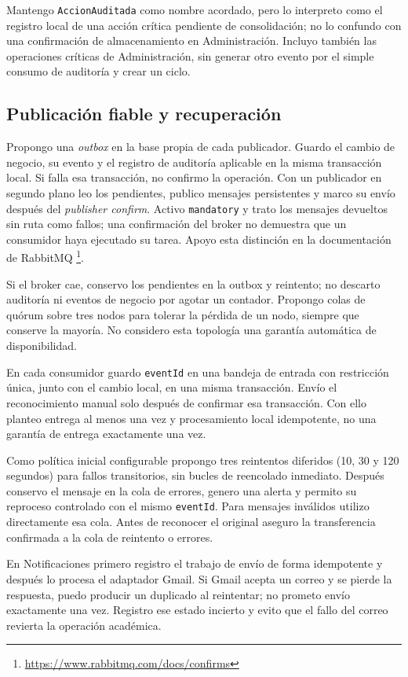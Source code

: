 Mantengo \texttt{AccionAuditada} como nombre acordado, pero lo interpreto
como el registro local de una acción crítica pendiente de consolidación;
no lo confundo con una confirmación de almacenamiento en Administración.
Incluyo también las operaciones críticas de Administración, sin generar
otro evento por el simple consumo de auditoría y crear un ciclo.

\subsection{Publicación fiable y recuperación}

Propongo una \textit{outbox} en la base propia de cada publicador.
Guardo el cambio de negocio, su evento y el registro de auditoría aplicable
en la misma transacción local. Si falla esa transacción, no confirmo
la operación. Con un publicador en segundo plano leo los pendientes,
publico mensajes persistentes y marco su envío después del
\textit{publisher confirm}. Activo \texttt{mandatory} y trato los mensajes
devueltos sin ruta como fallos; una confirmación del broker no demuestra
que un consumidor haya ejecutado su tarea.
Apoyo esta distinción en la documentación de RabbitMQ%
\footnote{\url{https://www.rabbitmq.com/docs/confirms}}.

Si el broker cae, conservo los pendientes en la outbox y reintento;
no descarto auditoría ni eventos de negocio por agotar un contador.
Propongo colas de quórum sobre tres nodos para tolerar la pérdida de
un nodo, siempre que conserve la mayoría. No considero esta topología
una garantía automática de disponibilidad.

En cada consumidor guardo \texttt{eventId} en una bandeja de entrada
con restricción única, junto con el cambio local, en una misma transacción.
Envío el reconocimiento manual solo después de confirmar esa transacción.
Con ello planteo entrega al menos una vez y procesamiento local idempotente,
no una garantía de entrega exactamente una vez.

Como política inicial configurable propongo tres reintentos diferidos
(10, 30 y 120 segundos) para fallos transitorios, sin bucles de
reencolado inmediato. Después conservo el mensaje en la cola de errores,
genero una alerta y permito su reproceso controlado con el mismo
\texttt{eventId}. Para mensajes inválidos utilizo directamente esa cola.
Antes de reconocer el original aseguro la transferencia confirmada
a la cola de reintento o errores.

En Notificaciones primero registro el trabajo de envío de forma idempotente
y después lo procesa el adaptador Gmail. Si Gmail acepta un correo y
se pierde la respuesta, puedo producir un duplicado al reintentar;
no prometo envío exactamente una vez. Registro ese estado incierto y
evito que el fallo del correo revierta la operación académica.

